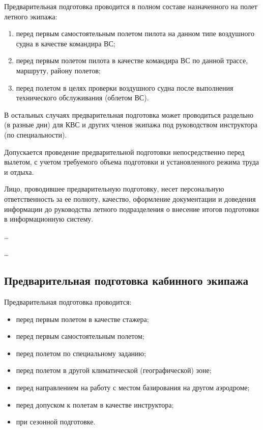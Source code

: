Предварительная подготовка проводится в полном составе назначенного на полет летного экипажа:
\begin{enumerate}[label=\alph*), ref=\alph*]
    \item перед первым самостоятельным полетом пилота на данном типе воздушного судна в качестве командира ВС; 
    \item перед первым полетом пилота в качестве командира ВС по данной трассе, маршруту, району полетов; 
    \item перед полетом в целях проверки воздушного судна после выполнения технического обслуживания (облетом ВС).
\end{enumerate}

В остальных случаях предварительная подготовка может проводиться раздельно (в разные дни) для КВС и других членов экипажа под руководством инструктора (по специальности).

Допускается проведение предварительной подготовки непосредственно перед вылетом, с учетом требуемого объема подготовки и установленного режима труда и отдыха.

Лицо, проводившее предварительную подготовку, несет персональную ответственность за ее полноту, качество, оформление документации и доведения информации до руководства летного подразделения о внесение итогов подготовки в информационную систему.


\dots

\dots




\subsection{Предварительная подготовка кабинного экипажа}


Предварительная подготовка проводится:
\begin{itemize}
    \item перед первым полетом в качестве стажера;
    \item перед первым самостоятельным полетом;
    \item перед полетом по специальному заданию;
    \item перед полетом в другой климатической (географической) зоне;
    \item перед направлением на работу с местом базирования на другом аэродроме;
    \item перед допуском к полетам в качестве инструктора;
    \item при сезонной подготовке. 
\end{itemize}

